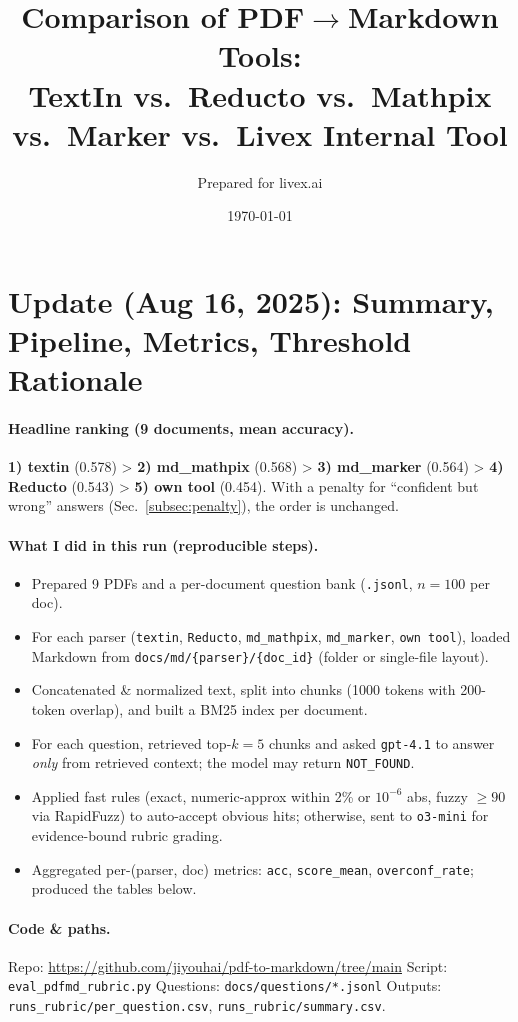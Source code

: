 \documentclass[11pt,a4paper]{article}
\title{Comparison of PDF\texorpdfstring{$\to$}{->}Markdown Tools:\\
TextIn vs.\ Reducto vs.\ Mathpix vs.\ Marker vs.\ Livex Internal Tool}
\author{Prepared for livex.ai}
\date{\today}
\begin{document}
\maketitle
\section*{Update (Aug 16, 2025): Summary, Pipeline, Metrics, Threshold Rationale}

\paragraph{Headline ranking (9 documents, mean accuracy).}
\textbf{1) textin} (0.578) \;>\; \textbf{2) md\_mathpix} (0.568) \;>\; \textbf{3) md\_marker} (0.564) \;>\; \textbf{4) Reducto} (0.543) \;>\; \textbf{5) own tool} (0.454).
With a penalty for ``confident but wrong'' answers (Sec.~\ref{subsec:penalty}), the order is unchanged.

\paragraph{What I did in this run (reproducible steps).}
\begin{itemize}
  \item Prepared 9 PDFs and a per-document question bank (\texttt{.jsonl}, $n=100$ per doc).
  \item For each parser (\texttt{textin}, \texttt{Reducto}, \texttt{md\_mathpix}, \texttt{md\_marker}, \texttt{own tool}), loaded Markdown from \texttt{docs/md/\{parser\}/\{doc\_id\}} (folder or single-file layout).
  \item Concatenated \& normalized text, split into chunks (1000 tokens with 200-token overlap), and built a BM25 index per document.
  \item For each question, retrieved top-$k=5$ chunks and asked \texttt{gpt-4.1} to answer \emph{only} from retrieved context; the model may return \texttt{NOT\_FOUND}.
  \item Applied fast rules (exact, numeric-approx within 2\% or $10^{-6}$ abs, fuzzy $\ge 90$ via RapidFuzz) to auto-accept obvious hits; otherwise, sent to \texttt{o3-mini} for evidence-bound rubric grading.
  \item Aggregated per-(parser, doc) metrics: \texttt{acc}, \texttt{score\_mean}, \texttt{overconf\_rate}; produced the tables below.
\end{itemize}

\paragraph{Code \& paths.}
Repo: \url{https://github.com/jiyouhai/pdf-to-markdown/tree/main} \; 
Script: \texttt{eval\_pdfmd\_rubric.py} \; 
Questions: \texttt{docs/questions/*.jsonl} \; 
Outputs: \texttt{runs\_rubric/per\_question.csv}, \texttt{runs\_rubric/summary.csv}.
\end{document}
